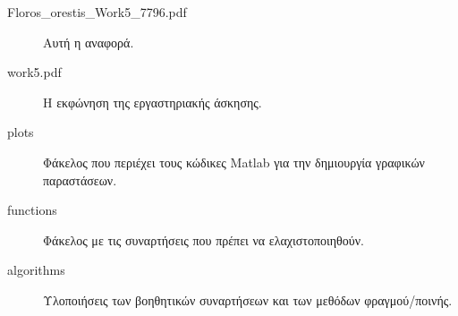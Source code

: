 \begin{description}
	\item[Floros\_orestis\_Work5\_7796.pdf] Αυτή η αναφορά.
	\item[work5.pdf] Η εκφώνηση της εργαστηριακής άσκησης.
	\item[plots] Φάκελος που περιέχει τους κώδικες Matlab για την δημιουργία γραφικών παραστάσεων.
	\item[functions] Φάκελος με τις συναρτήσεις που πρέπει να ελαχιστοποιηθούν.
	\item[algorithms] Υλοποιήσεις των βοηθητικών συναρτήσεων και των μεθόδων φραγμού/ποινής.
\end{description}





